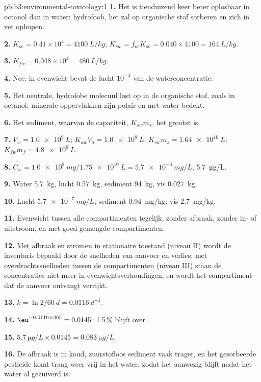 \begin{solution}{pb:b3:environmental-toxicology:1}
\textbf{1.} Het is tienduizend keer beter oplosbaar in octanol dan in
water: hydrofoob, het zal op organische stof sorberen en zich in vet
ophopen.

\textbf{2.} $K_{oc} = 0.41 \times 10^4 = \qty{4100}{L/kg}$; $K_{sw} = f_{oc}K_{oc} = 0.040 \times 4100 = \qty{164}{L/kg}$.

\textbf{3.} $K_{fw} = 0.048 \times 10^4 = \qty{480}{L/kg}$.

\textbf{4.} Nee: in evenwicht bevat de lucht $10^{-4}$ van de waterconcentratie.

\textbf{5.} Het neutrale, hydrofobe molecuul lost op in de organische
stof, zoals in octanol; minerale oppervlakken zijn polair en met water
bedekt.

\textbf{6.} Het sediment, waarvan de capaciteit, $K_{sw}m_s$, het grootst is.

\textbf{7.} $V_w = \qty{1.0e9}{L}$; $K_{aw}V_a = \qty{1.0e8}{L}$; $K_{sw}m_s = \qty{1.64e10}{L}$; $K_{fw}m_f = \qty{4.8e6}{L}$.

\textbf{8.} $C_w = \qty{1.0e8}{mg}/\qty{1.75e10}{L} = \qty{5.7e-3}{mg/L}$, \qty{5.7}{\micro g/L}.

\textbf{9.} Water \qty{5.7}{kg}, lucht \qty{0.57}{kg}, sediment \qty{94}{kg}, vis \qty{0.027}{kg}.

\textbf{10.} Lucht $\qty{5.7e-7}{mg/L}$; sediment \qty{0.94}{mg/kg}; vis \qty{2.7}{mg/kg}.

\textbf{11.} Evenwicht tussen alle compartimenten tegelijk, zonder afbraak,
zonder in- of uitstroom, en met goed gemengde compartimenten.

\textbf{12.} Met afbraak en stromen in stationaire toestand (niveau II)
wordt de inventaris bepaald door de snelheden van aanvoer en verlies; met
overdrachtssnelheden tussen de compartimenten (niveau III) staan de
concentraties niet meer in evenwichtsverhoudingen, en wordt het
compartiment dat de aanvoer ontvangt verrijkt.

\textbf{13.} $k = \ln 2/\qty{60}{d} = \qty{0.0116}{d^{-1}}$.

\textbf{14.} $\eu^{-0.0116 \times 365} = 0.0145$: 1.5\,\% blijft over.

\textbf{15.} $\qty{5.7}{\micro g/L} \times 0.0145 = \qty{0.083}{\micro g/L}$.

\textbf{16.} De afbraak is in koud, zuurstofloos sediment vaak trager, en
het gesorbeerde pesticide komt traag weer vrij in het water, zodat het
aanwezig blijft nadat het water al gezuiverd is.


\end{solution}
